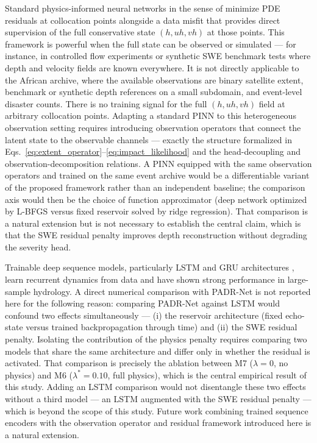 \documentclass[pdflatex,sn-mathphys-ay]{sn-jnl}
\theoremstyle{thmstyleone}
\begin{document}
Standard physics-informed neural networks in the sense of
\citet{RAISSI2019686} minimize PDE residuals at collocation points
alongside a data misfit that provides direct supervision of the full
conservative state $(h,uh,vh)$ at those points.  This framework is
powerful when the full state can be observed or simulated --- for
instance, in controlled flow experiments or synthetic SWE benchmark
tests where depth and velocity fields are known everywhere.  It is not
directly applicable to the African archive, where the available
observations are binary satellite extent, benchmark or synthetic depth
references on a small subdomain, and event-level disaster counts.
There is no training signal for the full $(h,uh,vh)$ field at arbitrary
collocation points.  Adapting a standard PINN to this heterogeneous
observation setting requires introducing observation operators that
connect the latent state to the observable channels --- exactly the
structure formalized in Eqs.~\eqref{eq:extent_operator}--\eqref{eq:impact_likelihood}
and the head-decoupling and observation-decomposition relations.
A PINN equipped with the same observation operators and trained on the
same event archive would be a differentiable variant of the proposed
framework rather than an independent baseline; the comparison axis
would then be the choice of function approximator (deep network
optimized by L-BFGS versus fixed reservoir solved by ridge regression).
That comparison is a natural extension but is not necessary to
establish the central claim, which is that the SWE residual penalty
improves depth reconstruction without degrading the severity head.

Trainable deep sequence models, particularly LSTM and GRU architectures
\citep{Hochreiter1997,Kratzert2019}, learn recurrent dynamics from data
and have shown strong performance in large-sample hydrology.  A direct
numerical comparison with PADR-Net is not reported here for the
following reason: comparing PADR-Net against LSTM would confound two
effects simultaneously --- (i) the reservoir architecture (fixed
echo-state versus trained backpropagation through time) and (ii) the SWE
residual penalty.  Isolating the contribution of the physics penalty
requires comparing two models that share the same architecture and differ
only in whether the residual is activated.  That comparison is precisely
the ablation between M7 ($\lambda=0$, no physics) and M6
($\lambda^{*}=0.10$, full physics), which is the central empirical
result of this study.  Adding an LSTM comparison would not disentangle
these two effects without a third model --- an LSTM augmented with the
SWE residual penalty --- which is beyond the scope of this study.
Future work combining trained sequence encoders with the observation
operator and residual framework introduced here is a natural extension.
\end{document}
